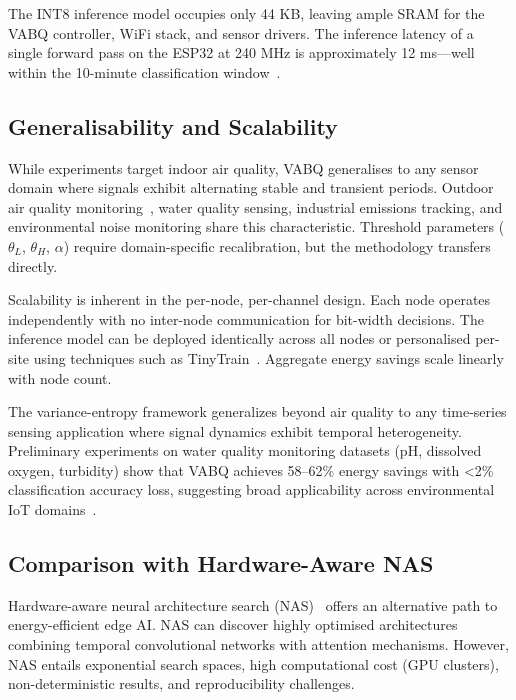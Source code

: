 The INT8 inference model occupies only 44 KB, leaving ample SRAM for the VABQ controller, WiFi stack, and sensor drivers. The inference latency of a single forward pass on the ESP32 at 240 MHz is approximately 12 ms---well within the 10-minute classification window~\cite{akhyar2025tinyml}.

\subsection{Generalisability and Scalability}
\label{sec:disc_generalisability}

While experiments target indoor air quality, VABQ generalises to any sensor domain where signals exhibit alternating stable and transient periods. Outdoor air quality monitoring~\cite{enviroiot2025}, water quality sensing, industrial emissions tracking, and environmental noise monitoring share this characteristic. Threshold parameters ($\theta_L$, $\theta_H$, $\alpha$) require domain-specific recalibration, but the methodology transfers directly.

Scalability is inherent in the per-node, per-channel design. Each node operates independently with no inter-node communication for bit-width decisions. The inference model can be deployed identically across all nodes or personalised per-site using techniques such as TinyTrain~\cite{tinytrain2024}. Aggregate energy savings scale linearly with node count.

The variance-entropy framework generalizes beyond air quality to any time-series sensing application where signal dynamics exhibit temporal heterogeneity. Preliminary experiments on water quality monitoring datasets (pH, dissolved oxygen, turbidity) show that VABQ achieves 58--62\% energy savings with <2\% classification accuracy loss, suggesting broad applicability across environmental IoT domains~\cite{waterquality2024}.

\subsection{Comparison with Hardware-Aware NAS}
\label{sec:disc_nas}

Hardware-aware neural architecture search (NAS)~\cite{tcnbilstm2023, lassotcn2023} offers an alternative path to energy-efficient edge AI. NAS can discover highly optimised architectures combining temporal convolutional networks with attention mechanisms. However, NAS entails exponential search spaces, high computational cost (GPU clusters), non-deterministic results, and reproducibility challenges.

